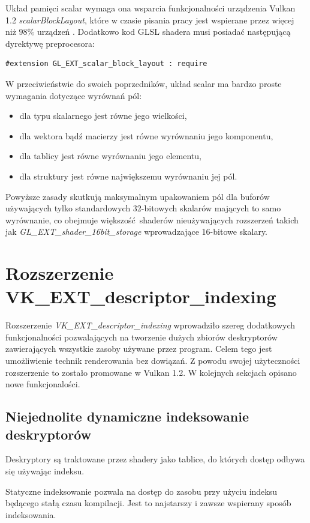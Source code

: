 Układ pamięci scalar wymaga ona wsparcia funkcjonalności urządzenia Vulkan 1.2 \textit{scalarBlockLayout}, które w czasie pisania pracy jest wspierane przez więcej niż $98\%$ urządzeń \cite{GPUINFO}.
Dodatkowo kod GLSL shadera musi posiadać następującą dyrektywę preprocesora:
\lstset{language=GLSL}
\begin{lstlisting}
#extension GL_EXT_scalar_block_layout : require
\end{lstlisting}

W przeciwieństwie do swoich poprzedników, układ scalar ma bardzo proste wymagania dotyczące wyrównań pól:
\begin{itemize}
	\item dla typu skalarnego jest równe jego wielkości,
	\item dla wektora bądź macierzy jest równe wyrównaniu jego komponentu,
	\item dla tablicy jest równe wyrównaniu jego elementu,
	\item dla struktury jest równe największemu wyrównaniu jej pól.
\end{itemize}
Powyższe zasady skutkują maksymalnym upakowaniem pól dla buforów używających tylko standardowych 32-bitowych skalarów mających to samo wyrównanie, co obejmuje większość shaderów nieużywających rozszerzeń takich jak \textit{GL\_EXT\_shader\_16bit\_storage} wprowadzające 16-bitowe skalary.


\section{Rozszerzenie VK\_EXT\_descriptor\_indexing}

Rozszerzenie \textit{VK\_EXT\_descriptor\_indexing} wprowadziło szereg dodatkowych funkcjonalności pozwalających na tworzenie dużych zbiorów
deskryptorów zawierających wszystkie zasoby używane przez program.
Celem tego jest umożliwienie technik renderowania bez dowiązań. Z powodu swojej użyteczności rozszerzenie to zostało promowane w Vulkan 1.2.
W kolejnych sekcjach opisano nowe funkcjonalości.

\subsection{Niejednolite dynamiczne indeksowanie deskryptorów}

Deskryptory są traktowane przez shadery jako tablice, do których dostęp odbywa się używając indeksu.

Statyczne indeksowanie pozwala na dostęp do zasobu przy użyciu indeksu będącego stałą czasu kompilacji. Jest to najstarszy i zawsze wspierany sposób indeksowania.

